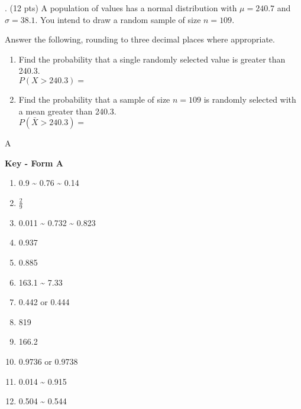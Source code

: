 \documentclass{article}
\providecommand{\tightlist}{\setlength{\itemsep}{0pt}\setlength{\parskip}{0pt}}
\newcommand{\newquestion}{\vspace{4mm} \noindent}
\begin{document}
\newquestion
12. (12 pts) A population of values has a normal distribution with \(\mu = 240.7\) and \(\sigma = 38.1\). You intend to draw a random sample of size \(n = 109\).

Answer the following, rounding to three decimal places where appropriate.

\begin{enumerate}[label=\alph*.]
\item
Find the probability that a single randomly selected value is greater
than 240.3.\\
$P(X > 240.3) = $
\vspace{30mm}

\item
Find the probability that a sample of size \(n = 109\) is randomly
selected with a mean greater than 240.3.\\
$P(\bar{X} > 240.3) = $
\vspace{30mm}

\end{enumerate}

\vfill \hfill {\tiny A}
\pagebreak

\textbf{Key - Form A}
\begin{enumerate}[label=\arabic*.]
\tightlist
\item 0.9 \textasciitilde{} 0.76 \textasciitilde{} 0.14
\item \(\frac{2}{9}\)
\item 0.011 \textasciitilde{} 0.732 \textasciitilde{} 0.823
\item 0.937
\item 0.885
\item 163.1 \textasciitilde{} 7.33
\item 0.442 or 0.444
\item 819
\item 166.2
\item 0.9736 or 0.9738
\item 0.014 \textasciitilde{} 0.915
\item 0.504 \textasciitilde{} 0.544
\end{enumerate}
\end{document}
